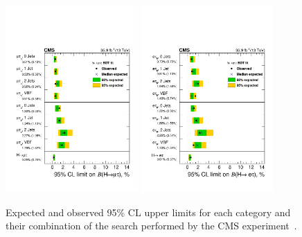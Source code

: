 \begin{figure}[htbp]
  \centering
  \includegraphics[width=0.45\textwidth]{plots/chapter2/BHmt.pdf}
  \includegraphics[width=0.45\textwidth]{plots/chapter2/BHet.pdf}
  \caption{Expected and observed 95\% CL upper limits for each category and their combination of the search performed by the CMS experiment~\cite{Sirunyan:2019shc}.}
  \label{fig:bh}
\end{figure}

